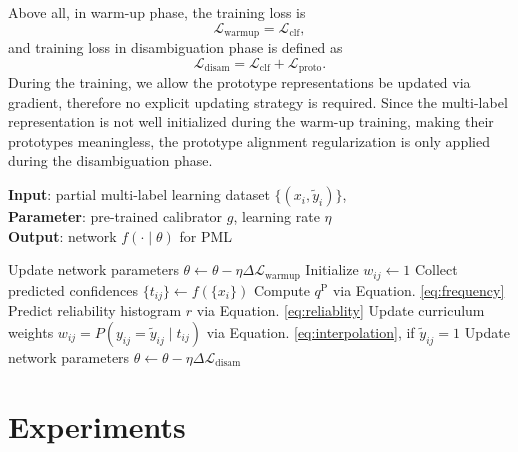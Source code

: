 \documentclass[letterpaper]{article} %
\begin{document}
  Above all, in warm-up phase, the training loss is
  \begin{equation}
  \label{eq:loss-warmup}
    \mathcal{L}_\text{warmup} = \mathcal{L}_\text{clf},
  \end{equation}
  and training loss in disambiguation phase is defined as
  \begin{equation}
  \label{loss-disambiguation}
    \mathcal{L}_\text{disam} = \mathcal{L}_\text{clf} + \mathcal{L}_\text{proto}.
  \end{equation}
  During the training, we allow the prototype representations be updated via gradient, therefore no explicit updating strategy is required. 
  Since the multi-label representation is not well initialized during the warm-up training, making their prototypes meaningless, the prototype alignment regularization is only applied during the disambiguation phase.

  \begin{algorithm}[tb]
    \textbf{Input}: 
      partial multi-label learning dataset $\{(x_i, \tilde y_i)\}$,
      \\
    \textbf{Parameter}: 
      pre-trained calibrator \(g\),
      learning rate $\eta$
      \\
    \textbf{Output}: 
      network $f(\cdot \mid \theta)$ for PML
    \begin{algorithmic}[1] %
      \REPEAT
        \STATE Update network parameters $\theta \leftarrow \theta - \eta \Delta \mathcal{L}_\text{warmup}$
      \STATE Initialize $w_{ij} \leftarrow 1$
      \REPEAT
        \STATE Collect predicted confidences $\{t_{ij} \} \leftarrow f(\{x_i\})$
        \STATE Compute $q^\text{P}$ via Equation. \ref{eq:frequency}
        \STATE Predict reliability histogram $r$ via Equation. \ref{eq:reliablity}
        \STATE Update curriculum weights $w_{ij} = P(y_{ij} = \tilde y_{ij} \mid t_{ij})$ via Equation. \ref{eq:interpolation}, if $\tilde y_{ij} = 1$
        \STATE Update network parameters $\theta \leftarrow \theta - \eta \Delta \mathcal{L}_\text{disam}$
    \end{algorithmic}
    \caption{Algorithm of PML-CD}
    \label{alg:algorithm}
  \end{algorithm}

\section{Experiments}
\end{document}
